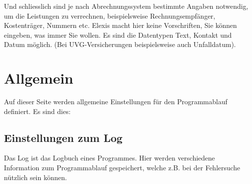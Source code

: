 Und schliesslich sind je nach Abrechnungssystem bestimmte Angaben notwendig, um die Leistungen zu verrechnen, beispielsweise Rechnungsempfänger, Kostenträger, Nummern etc.
Elexis macht hier keine Vorschriften, Sie können eingeben, was immer Sie wollen. Es sind die Datentypen Text, Kontakt und Datum möglich. (Bei UVG-Versicherungen beispielsweise auch \glqq Unfalldatum\grqq{}).\\


\section{Allgemein}
Auf dieser Seite werden allgemeine Einstellungen für den Programmablauf
definiert. Es sind dies:
\subsection{Einstellungen zum Log}
Das \glqq Log\grqq{} ist das Logbuch eines Programmes. Hier werden verschiedene
Information zum Programmablauf gespeichert, welche z.B. bei der Fehlersuche
nützlich sein können.
